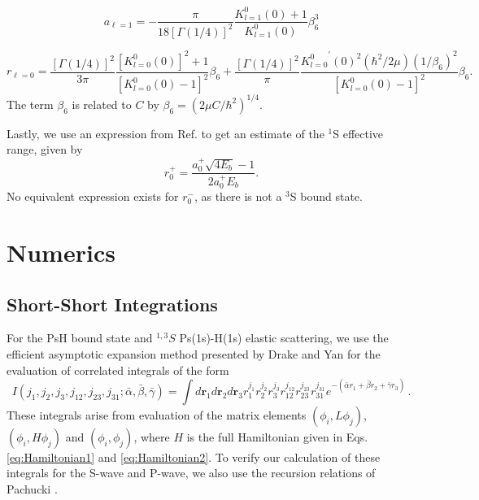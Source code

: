 \documentclass[preprint,showpacs,preprintnumbers,amsmath,amssymb,longbibliography,pra,aps]{revtex4-1}
\newcommand{\todoi}{\todo[inline]}
\begin{document}
\begin{equation}
\label{eq:GaoScatLenP}
a_{\ell=1} = -\frac{\pi}{18[\Gamma(1/4)]^2} \frac{K_{l=1}^0(0) + 1}{K_{l=1}^0(0)} \beta_6^3
\end{equation}

\begin{equation}
\label{eq:GaoEffRange}
r_{\ell=0} = \frac{[\Gamma(1/4)]^2}{3\pi} \frac{[K_{l=0}^0(0)]^2 + 1}{[K_{l=0}^0(0) - 1]^2} \beta_6 + \frac{[\Gamma(1/4)]^2}{\pi} \frac{{K_{l=0}^0}^\prime(0)^2(\hbar^2/2\mu)(1/\beta_6)^2}{[K_{l=0}^0(0) - 1]^2} \beta_6.
\end{equation}
The term $\beta_6$ is related to $C$ by $\beta_6 = (2\mu C/\hbar^2)^{1/4}$.

Lastly, we use an expression from Ref. \cite{Blackwood2002} to get an estimate of the $^1$S effective range, given by
\begin{equation}
\label{eq:BlackwoodERT}
r_0^+ = \frac{a_0^+ \sqrt{4 E_b} - 1}{2 a_0^+ E_b}.
\end{equation}
No equivalent expression exists for $r_0^-$, as there is not a $^3$S bound state.


\section{Numerics}
\label{sec:Numerical}

\subsection{Short-Short Integrations}
\label{sec:ShortInt}
For the PsH bound state and $^{1,3}S$ Ps(1s)-H(1s) elastic scattering, we use the efficient asymptotic expansion method presented by Drake and Yan \cite{Drake1995} for the evaluation of correlated integrals of the form
\begin{equation}
\label{eq:ShortInt}
I(j_1,j_2,j_3,j_{12},j_{23},j_{31}; \bar{\alpha}, \bar{\beta}, \bar{\gamma}) =
\int
d \textbf{r}_1 d \textbf{r}_2 d \textbf{r}_3
r_1^{j_1} r_2^{j_2} r_3^{j_3} r_{12}^{j_{12}}
r_{23}^{j_{23}} r_{31}^{j_{31}}
e^{-(\bar{\alpha} r_1 + \bar{\beta} r_2 + \bar{\gamma} r_3)}\, .
\end{equation}
These integrals arise from evaluation of the matrix elements $(\phi_i, L \phi_j)$, $(\phi_i, H \phi_j)$ and $(\phi_i, \phi_j)$, where $H$ is the full Hamiltonian given in Eqs. \ref{eq:Hamiltonian1} and \ref{eq:Hamiltonian2}. To verify our calculation of these integrals for the S-wave and P-wave, we also use the recursion relations of Pachucki \cite{Pachucki2004}.
\end{document}
